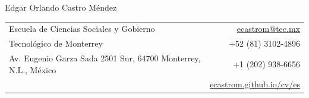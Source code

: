 \documentclass[11pt]{article}
\begin{document}
{\LARGE Edgar Orlando Castro Méndez}\par
\vspace{6pt}
\begin{tabularx}{\textwidth}{@{}X r@{}}
Escuela de Ciencias Sociales y Gobierno & \href{mailto:ecastrom@tec.mx}{ecastrom@tec.mx} \\
Tecnológico de Monterrey & +52 (81) 3102-4896 \\
Av. Eugenio Garza Sada 2501 Sur, 64700 Monterrey, N.L., México & +1 (202) 938-6656 \\
 & \href{https://ecastrom.github.io/cv/es/main}{ecastrom.github.io/cv/es} \\
\end{tabularx}


\end{document}
